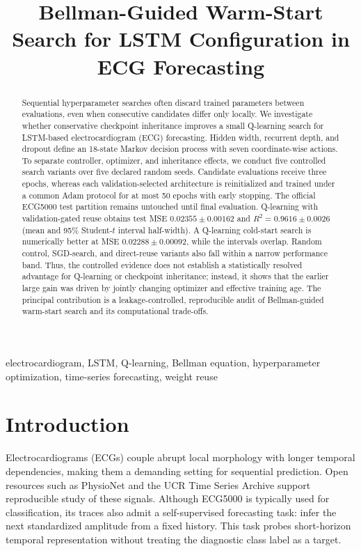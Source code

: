 \documentclass[conference]{IEEEtran}
\title{Bellman-Guided Warm-Start Search for LSTM Configuration in ECG Forecasting}
\author{%
\IEEEauthorblockN{Ahadul Haque Shovo and Mohana Chowdhury}
\IEEEauthorblockA{Aviation and Aerospace University, Bangladesh\\
Old Airport, Tejgaon, Dhaka 1215, Bangladesh\\
Email: suvo\_23024006@aaub.edu.bd; mohanachy2004@gmail.com}}
\begin{document}
\pagestyle{empty}
\maketitle
\thispagestyle{wieconfirst}

\begin{abstract}
Sequential hyperparameter searches often discard trained parameters between evaluations, even when consecutive candidates differ only locally. We investigate whether conservative checkpoint inheritance improves a small Q-learning search for LSTM-based electrocardiogram (ECG) forecasting. Hidden width, recurrent depth, and dropout define an 18-state Markov decision process with seven coordinate-wise actions. To separate controller, optimizer, and inheritance effects, we conduct five controlled search variants over five declared random seeds. Candidate evaluations receive three epochs, whereas each validation-selected architecture is reinitialized and trained under a common Adam protocol for at most 50 epochs with early stopping. The official ECG5000 test partition remains untouched until final evaluation. Q-learning with validation-gated reuse obtains test MSE $0.02355\pm0.00162$ and $R^2=0.9616\pm0.0026$ (mean and 95\% Student-$t$ interval half-width). A Q-learning cold-start search is numerically better at MSE $0.02288\pm0.00092$, while the intervals overlap. Random control, SGD-search, and direct-reuse variants also fall within a narrow performance band. Thus, the controlled evidence does not establish a statistically resolved advantage for Q-learning or checkpoint inheritance; instead, it shows that the earlier large gain was driven by jointly changing optimizer and effective training age. The principal contribution is a leakage-controlled, reproducible audit of Bellman-guided warm-start search and its computational trade-offs.
\end{abstract}

\begin{IEEEkeywords}
electrocardiogram, LSTM, Q-learning, Bellman equation, hyperparameter optimization, time-series forecasting, weight reuse
\end{IEEEkeywords}

\section{Introduction}
Electrocardiograms (ECGs) couple abrupt local morphology with longer temporal dependencies, making them a demanding setting for sequential prediction. Open resources such as PhysioNet \cite{goldberger2000physiobank} and the UCR Time Series Archive \cite{dau2019ucr} support reproducible study of these signals. Although ECG5000 is typically used for classification, its traces also admit a self-supervised forecasting task: infer the next standardized amplitude from a fixed history. This task probes short-horizon temporal representation without treating the diagnostic class label as a target.
\end{document}
